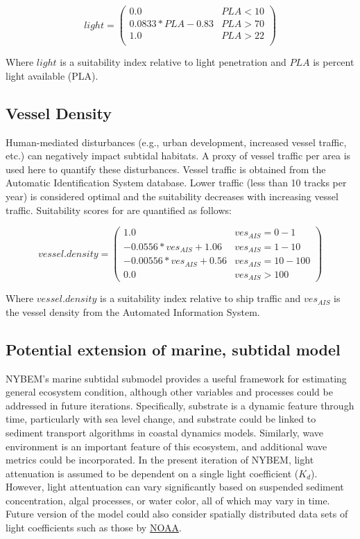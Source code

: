 \documentclass[
]{book}
\begin{document}
\[light = \begin{pmatrix} 0.0 & PLA<10\\
0.0833*PLA-0.83 & PLA>70\\
1.0 & PLA>22\\
\end{pmatrix}\]

Where \(light\) is a suitability index relative to light penetration and \(PLA\) is percent light available (PLA).

\hypertarget{vessel-density}{%
\subsection{Vessel Density}\label{vessel-density}}

Human-mediated disturbances (e.g., urban development, increased vessel traffic, etc.) can negatively impact subtidal habitats. A proxy of vessel traffic per area is used here to quantify these disturbances. Vessel traffic is obtained from the Automatic Identification System database. Lower traffic (less than 10 tracks per year) is considered optimal and the suitability decreases with increasing vessel traffic. Suitability scores for are quantified as follows:

\[vessel.density = \begin{pmatrix} 1.0 & ves_{AIS}=0-1\\
-0.0556*ves_{AIS}+1.06 & ves_{AIS}=1-10\\
-0.00556*ves_{AIS}+0.56 & ves_{AIS}=10-100\\
0.0 & ves_{AIS}>100
\end{pmatrix}\]

Where \(vessel.density\) is a suitability index relative to ship traffic and \(ves_{AIS}\) is the vessel density from the Automated Information System.

\hypertarget{potential-extension-of-marine-subtidal-model}{%
\subsection{Potential extension of marine, subtidal model}\label{potential-extension-of-marine-subtidal-model}}

NYBEM's marine subtidal submodel provides a useful framework for estimating general ecosystem condition, although other variables and processes could be addressed in future iterations. Specifically, substrate is a dynamic feature through time, particularly with sea level change, and substrate could be linked to sediment transport algorithms in coastal dynamics models. Similarly, wave environment is an important feature of this ecosystem, and additional wave metrics could be incorporated. In the present iteration of NYBEM, light attenuation is assumed to be dependent on a single light coefficient (\(K_{d}\)). However, light attentuation can vary significantly based on suspended sediment concentration, algal processes, or water color, all of which may vary in time. Future version of the model could also consider spatially distributed data sets of light coefficients such as those by \href{https://www.fisheries.noaa.gov/inport/item/66148}{NOAA}.
\end{document}

